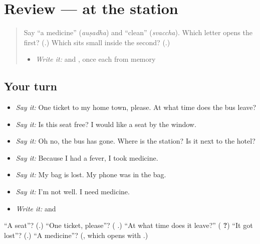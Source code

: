 \section[(review)]{Review — at the station}

\label{lesson:KA-R314-at-the-station}



\begin{quote}
Say \textquotedblleft{}a medicine\textquotedblright{} (\emph{auṣadha}) and \textquotedblleft{}clean\textquotedblright{} (\emph{svaccha}). Which letter opens the first? (\textbf{}.) Which sits small inside the second? (\textbf{}.)

\begin{itemize}
\raggedright
  \item \emph{Write it:} \textbf{} and \textbf{}, once each from memory
\end{itemize}
\end{quote}

\subsection*{Your turn}
\begin{itemize}
\raggedright
  \item \emph{Say it:} One ticket to my home town, please. At what time does the bus leave?
  \item \emph{Say it:} Is this seat free? I would like a seat by the window.
  \item \emph{Say it:} Oh no, the bus has gone. Where is the station? Is it next to the hotel?
  \item \emph{Say it:} Because I had a fever, I took medicine.
  \item \emph{Say it:} My bag is lost. My phone was in the bag.
  \item \emph{Say it:} I'm not well. I need medicine.
  \item \emph{Write it:} \textbf{} and \textbf{}
\end{itemize}

\begin{tcolorbox}[breakable,colback=teal!4,colframe=teal!35!black,title={Before you move on}]
\textquotedblleft{}A seat\textquotedblright{}? (\textbf{}.) \textquotedblleft{}One ticket, please\textquotedblright{}? (\textbf{  }.) \textquotedblleft{}At what time does it leave?\textquotedblright{} (\textbf{  ?}) \textquotedblleft{}It got lost\textquotedblright{}? (\textbf{}.) \textquotedblleft{}A medicine\textquotedblright{}? (\textbf{}, which opens with \textbf{}.)
\end{tcolorbox}
